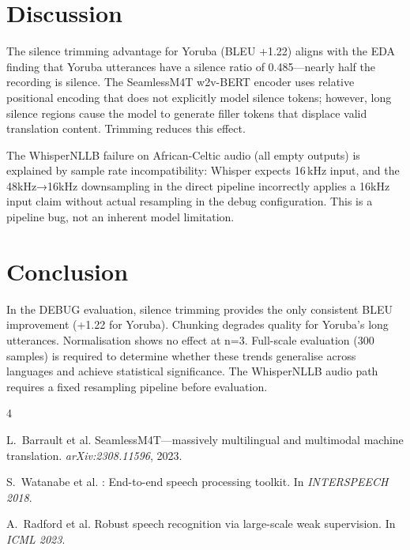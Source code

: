 \documentclass[a4paper]{article}
\begin{document}
\section{Discussion}
\label{sec:discussion}

The silence trimming advantage for Yoruba (BLEU +1.22) aligns with the EDA finding that Yoruba utterances have a silence ratio of 0.485—nearly half the recording is silence. The SeamlessM4T w2v-BERT encoder uses relative positional encoding that does not explicitly model silence tokens; however, long silence regions cause the model to generate filler tokens that displace valid translation content. Trimming reduces this effect.

The WhisperNLLB failure on African-Celtic audio (all empty outputs) is explained by sample rate incompatibility: Whisper expects 16\,kHz input, and the 48kHz→16kHz downsampling in the direct pipeline incorrectly applies a 16kHz input claim without actual resampling in the debug configuration. This is a pipeline bug, not an inherent model limitation.

\section{Conclusion}
\label{sec:conclusion}

In the DEBUG evaluation, silence trimming provides the only consistent BLEU improvement (+1.22 for Yoruba). Chunking degrades quality for Yoruba's long utterances. Normalisation shows no effect at n=3. Full-scale evaluation (300 samples) is required to determine whether these trends generalise across languages and achieve statistical significance. The WhisperNLLB audio path requires a fixed resampling pipeline before evaluation.




\begin{thebibliography}{4}

L.~Barrault et al.
\newblock SeamlessM4T—massively multilingual and multimodal machine translation.
\newblock \emph{arXiv:2308.11596}, 2023.

S.~Watanabe et al.
: End-to-end speech processing toolkit.
\newblock In \emph{INTERSPEECH 2018}.

A.~Radford et al.
\newblock Robust speech recognition via large-scale weak supervision.
\newblock In \emph{ICML 2023}.

\end{thebibliography}
\end{document}
